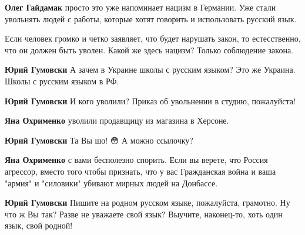 \begin{itemize}
\begin{itemize}


\textbf{Олег Гайдамак} просто это уже напоминает нацизм в Германии. Уже стали
увольнять людей с работы, которые хотят говорить и использовать русский язык.


Если человек громко и четко заявляет, что будет нарушать закон, то естесственно, что он должен быть уволен. Какой же здесь нацизм? Только соблюдение закона.


\textbf{Юрий Гумовски} А зачем в Украине школы с русским языком? Это же Украина. Школы с русским языком в РФ.


\textbf{Юрий Гумовски} И кого уволили? Приказ об увольнении в студию, пожалуйста!


\textbf{Яна Охрименко} уволили продавщицу из магазина в Херсоне.


\textbf{Юрий Гумовски} Та Вы шо! 😳 А можно ссылочку?


\textbf{Яна Охрименко} с вами бесполезно спорить. Если вы верете, что Россия агрессор, вместо того чтобы признать, что у вас Гражданская война и ваша "армия" и "силовики" убивают мирных людей на Донбассе.


\textbf{Юрий Гумовски} Пишите на родном русском языке, пожалуйста, грамотно. Ну что ж Вы так? Разве не уважаете свой язык? Выучите, наконец-то, хоть один язык, свой родной!


\end{itemize}
\end{itemize}

